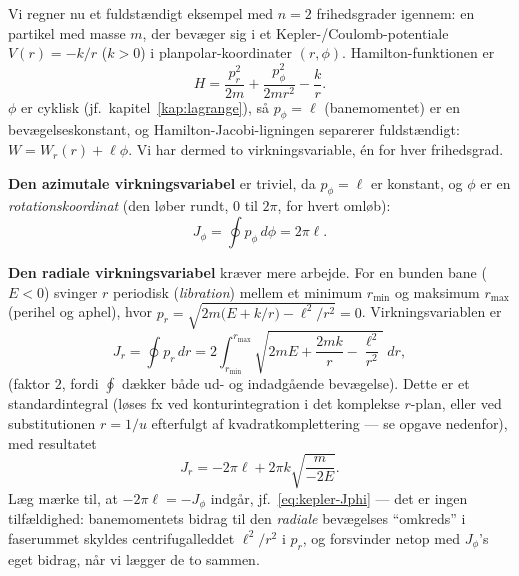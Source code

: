 \begin{eksempel}
Vi regner nu et fuldstændigt eksempel med $n=2$ frihedsgrader
igennem: en partikel med masse $m$, der bevæger sig i et
Kepler-/Coulomb-potentiale $V(r)=-k/r$ ($k>0$) i planpolar-koordinater
$(r,\phi)$. Hamilton-funktionen er
\begin{equation}
  H = \frac{p_r^2}{2m} + \frac{p_\phi^2}{2mr^2} - \frac{k}{r}.
\end{equation}
$\phi$ er cyklisk (jf.\ kapitel~\ref{kap:lagrange}), så $p_\phi=\ell$
(banemomentet) er en bevægelseskonstant, og
Hamilton-Jacobi-ligningen separerer fuldstændigt: $W=W_r(r)+\ell\phi$.
Vi har dermed to virkningsvariable, én for hver frihedsgrad.

\textbf{Den azimutale virkningsvariabel} er triviel, da $p_\phi=\ell$
er konstant, og $\phi$ er en \emph{rotationskoordinat} (den løber
rundt, $0$ til $2\pi$, for hvert omløb):
\begin{equation}
  J_\phi = \oint p_\phi\,d\phi = 2\pi\ell.
  \label{eq:kepler-Jphi}
\end{equation}

\textbf{Den radiale virkningsvariabel} kræver mere arbejde. For en
bunden bane ($E<0$) svinger $r$ periodisk (\emph{libration}) mellem et
minimum $r_{\min}$ og maksimum $r_{\max}$ (perihel og aphel), hvor
$p_r=\sqrt{2m\bigl(E+k/r\bigr)-\ell^2/r^2}=0$. Virkningsvariablen er
\begin{equation}
  J_r = \oint p_r\,dr = 2\int_{r_{\min}}^{r_{\max}}
    \sqrt{2mE + \frac{2mk}{r} - \frac{\ell^2}{r^2}}\;dr,
  \label{eq:kepler-Jr-integral}
\end{equation}
(faktor $2$, fordi $\oint$ dækker både ud- og indadgående bevægelse).
Dette er et standardintegral (løses fx ved konturintegration i det
komplekse $r$-plan, eller ved substitutionen $r=1/u$ efterfulgt af
kvadratkomplettering — se opgave nedenfor), med resultatet
\begin{equation}
  J_r = -2\pi\ell + 2\pi k\sqrt{\frac{m}{-2E}}.
  \label{eq:kepler-Jr}
\end{equation}
Læg mærke til, at $-2\pi\ell=-J_\phi$ indgår, jf.\
\eqref{eq:kepler-Jphi} — det er ingen tilfældighed: banemomentets
bidrag til den \emph{radiale} bevægelses ``omkreds'' i faserummet
skyldes centrifugalleddet $\ell^2/r^2$ i $p_r$, og forsvinder netop
med $J_\phi$'s eget bidrag, når vi lægger de to sammen.


\end{eksempel}
